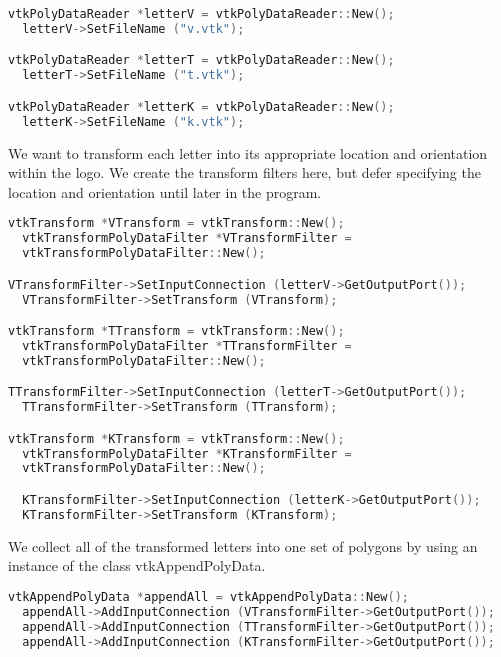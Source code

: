 \begin{lstlisting}[language=C++, caption={Reading the polygonal models of each letter.}]
vtkPolyDataReader *letterV = vtkPolyDataReader::New();
  letterV->SetFileName ("v.vtk");

vtkPolyDataReader *letterT = vtkPolyDataReader::New();
  letterT->SetFileName ("t.vtk");

vtkPolyDataReader *letterK = vtkPolyDataReader::New();
  letterK->SetFileName ("k.vtk");
\end{lstlisting}

We want to transform each letter into its appropriate location and orientation within the logo. We create the transform filters here, but defer specifying the location and orientation until later in the program.

\begin{lstlisting}[language=C++, caption={Transform each letter into ita appropriate location.}]
vtkTransform *VTransform = vtkTransform::New();
  vtkTransformPolyDataFilter *VTransformFilter =
  vtkTransformPolyDataFilter::New();

VTransformFilter->SetInputConnection (letterV->GetOutputPort());
  VTransformFilter->SetTransform (VTransform);

vtkTransform *TTransform = vtkTransform::New();
  vtkTransformPolyDataFilter *TTransformFilter =
  vtkTransformPolyDataFilter::New();

TTransformFilter->SetInputConnection (letterT->GetOutputPort());
  TTransformFilter->SetTransform (TTransform);

vtkTransform *KTransform = vtkTransform::New();
  vtkTransformPolyDataFilter *KTransformFilter =
  vtkTransformPolyDataFilter::New();

  KTransformFilter->SetInputConnection (letterK->GetOutputPort());
  KTransformFilter->SetTransform (KTransform);
\end{lstlisting}

We collect all of the transformed letters into one set of polygons by using an instance of the class vtkAppendPolyData.

\begin{lstlisting}[language=C++, caption={Collect the transformed letters into one set of polygons.}]
vtkAppendPolyData *appendAll = vtkAppendPolyData::New();
  appendAll->AddInputConnection (VTransformFilter->GetOutputPort());
  appendAll->AddInputConnection (TTransformFilter->GetOutputPort());
  appendAll->AddInputConnection (KTransformFilter->GetOutputPort());
\end{lstlisting}

